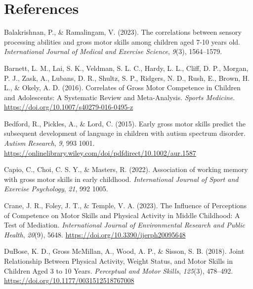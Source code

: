 \documentclass[
  letterpaper,
  DIV=11,
  numbers=noendperiod]{scrreprt}
\newlength{\cslhangindent}
\newenvironment{CSLReferences}[2] %
 {\begin{list}{}{%
  \setlength{\itemindent}{0pt}
  \setlength{\leftmargin}{0pt}
  \setlength{\parsep}{0pt}
  \ifodd #1
   \setlength{\leftmargin}{\cslhangindent}
   \setlength{\itemindent}{-1\cslhangindent}
  \fi
  \setlength{\itemsep}{#2\baselineskip}}}
 {\end{list}}
\begin{document}

\chapter*{References}\label{references}


\label{refs}
\begin{CSLReferences}{1}{0}
Balakrishnan, P., \& Ramalingam, V. (2023). The correlations between
sensory processing abilities and gross motor skills among children aged
7-10 years old. \emph{International Journal of Medical and Exercise
Science}, \emph{9}(3), 1564--1579.

Barnett, L. M., Lai, S. K., Veldman, S. L. C., Hardy, L. L., Cliff, D.
P., Morgan, P. J., Zask, A., Lubans, D. R., Shultz, S. P., Ridgers, N.
D., Rush, E., Brown, H. L., \& Okely, A. D. (2016). Correlates of Gross
Motor Competence in Children and Adolescents: A Systematic Review and
Meta-Analysis. \emph{Sports Medicine}.
\url{https://doi.org/10.1007/s40279-016-0495-z}

Bedford, R., Pickles, A., \& Lord, C. (2015). Early gross motor skills
predict the subsequent development of language in children with autism
spectrum disorder. \emph{Autism Research}, \emph{9}, 993 1001.
\url{https://onlinelibrary.wiley.com/doi/pdfdirect/10.1002/aur.1587}

Capio, C., Choi, C. S. Y., \& Masters, R. (2022). Association of working
memory with gross motor skills in early childhood. \emph{International
Journal of Sport and Exercise Psychology}, \emph{21}, 992 1005.

Crane, J. R., Foley, J. T., \& Temple, V. A. (2023). The Influence of
Perceptions of Competence on Motor Skills and Physical Activity in
Middle Childhood: A Test of Mediation. \emph{International Journal of
Environmental Research and Public Health}, \emph{20}(9), 5648.
\url{https://doi.org/10.3390/ijerph20095648}

DuBose, K. D., Gross McMillan, A., Wood, A. P., \& Sisson, S. B. (2018).
Joint Relationship Between Physical Activity, Weight Status, and Motor
Skills in Children Aged 3 to 10 Years. \emph{Perceptual and Motor
Skills}, \emph{125}(3), 478--492.
\url{https://doi.org/10.1177/0031512518767008}


\end{CSLReferences}
\end{document}
